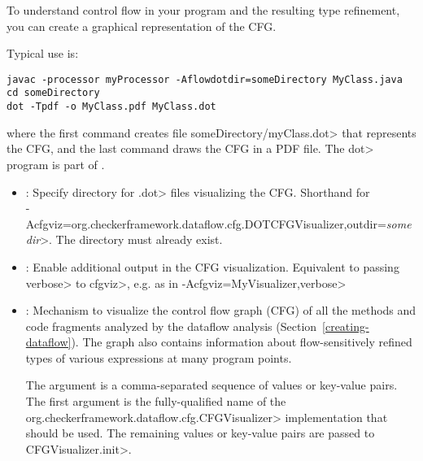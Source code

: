 
To understand control flow in your program and the resulting type
refinement, you can create a graphical representation of the CFG.

Typical use is:

\begin{Verbatim}
javac -processor myProcessor -Aflowdotdir=someDirectory MyClass.java
cd someDirectory
dot -Tpdf -o MyClass.pdf MyClass.dot
\end{Verbatim}

\noindent
where the first command creates file \<someDirectory/myClass.dot> that
represents the CFG, and the last command draws the CFG in a PDF file.
The \<dot> program is part of .


\begin{itemize}

\item {}:
  Specify directory for \<.dot> files visualizing the CFG\@.
  Shorthand for\\
  \<-Acfgviz=org.checkerframework.dataflow.cfg.DOTCFGVisualizer,outdir=\emph{somedir}>.
  The directory must already exist.

\item {}:
  Enable additional output in the CFG visualization.
  Equivalent to passing \<verbose> to \<cfgviz>, e.g. as in
  \<-Acfgviz=MyVisualizer,verbose>

\item {}:
  Mechanism to visualize the control flow graph (CFG) of
  all the methods and code fragments
  analyzed by the dataflow analysis (Section~\ref{creating-dataflow}).
  The graph also contains information about flow-sensitively refined
  types of various expressions at many program points.

  The argument is a comma-separated sequence of values or key-value pairs.
  The first argument is the fully-qualified name of the
  \<org.checkerframework.dataflow.cfg.CFGVisualizer> implementation
  that should be used. The remaining values or key-value pairs are
  passed to \<CFGVisualizer.init>.

\end{itemize}



